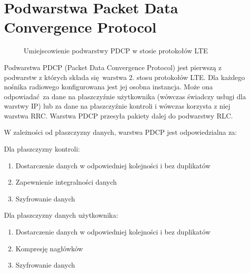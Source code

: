 \chapter{Podwarstwa Packet Data Convergence Protocol}
\label{cha:pdcp}

\begin{figure}[ht]
	\centerline{}
	\caption{Umiejscowienie podwarstwy PDCP w stosie protokołów LTE}
	\label{fig:pdcpseq}
\end{figure}

Podwarstwa PDCP (Packet Data Convergence Protocol) jest pierwszą z podwarstw z których składa się warstwa 2. stosu protokołów LTE. Dla każdego nośnika radiowego konfigurowana jest jej osobna instancja. Może ona odpowiadać za dane na płaszczyźnie użytkownika (wówczas świadczy usługi dla warstwy IP) lub za dane na płaszczyźnie kontroli i wówczas korzysta z niej warstwa RRC. Warstwa PDCP przesyła pakiety dalej do podwarstwy RLC.

W zależności od płaszczyzny danych, warstwa PDCP jest odpowiedzialna za:

Dla płaszczyzny kontroli:
\begin{enumerate}
	\item Dostarczenie danych w odpowiedniej kolejności i bez duplikatów
	\item Zapewnienie integralności danych
	\item Szyfrowanie danych
\end{enumerate}

Dla płaszczyzny danych użytkownika:
\begin{enumerate}
	\item Dostarczenie danych w odpowiedniej kolejności i bez duplikatów
	\item Kompresję nagłówków
	\item Szyfrowanie danych
\end{enumerate}

